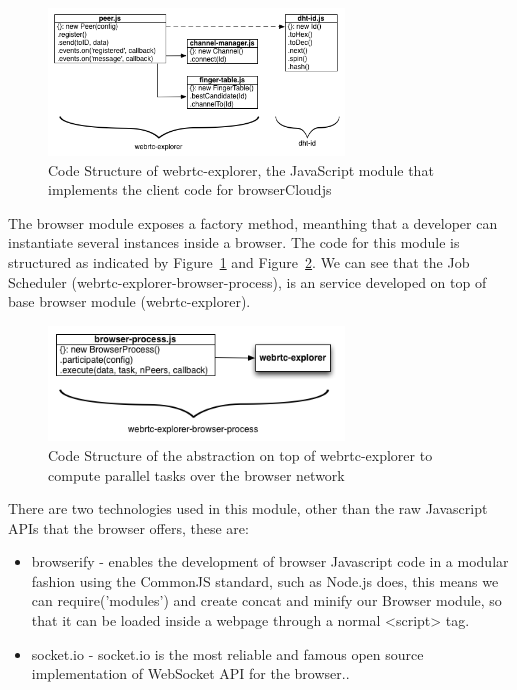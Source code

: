\begin{figure}[h!]
  \centering
  \includegraphics[width=0.7\textwidth]{figs/diagram-webrtc-explorer}
  \caption{Code Structure of webrtc-explorer, the JavaScript module that implements the client code for browserCloudjs}
  \label{fig:d-w-e}
\end{figure}

The browser module exposes a factory method, meanthing that a developer can instantiate several instances inside a browser. The code for this module is structured as indicated by Figure~\ref{fig:d-w-e} and Figure~\ref{fig:d-w-e-b-p}. We can see that the Job Scheduler (webrtc-explorer-browser-process), is an service developed on top of base browser module (webrtc-explorer).

\begin{figure}[h!]
  \centering
  \includegraphics[width=0.7\textwidth]{figs/diagram-webrtc-explorer-browser-process}
  \caption{Code Structure of the abstraction on top of webrtc-explorer to compute parallel tasks over the browser network}
  \label{fig:d-w-e-b-p}
\end{figure}



There are two technologies used in this module, other than the raw Javascript APIs that the browser offers, these are:

\begin{itemize}
    \item browserify - enables the development of browser Javascript code in a modular fashion using the CommonJS standard, such as Node.js does, this means we can require('modules') and create concat and minify our Browser module, so that it can be loaded inside a webpage through a normal <script> tag.
    \item socket.io - socket.io is the most reliable and famous open source implementation of WebSocket API for the browser..
\end{itemize}

